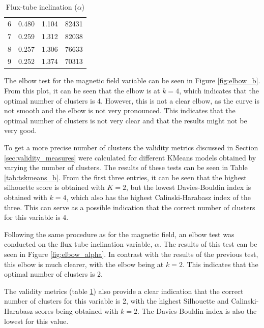 \begin{table}[h]
\begin{subtable}[h]{0.48\textwidth}
\begin{tabular}{@{}cccc@{}}
            6          & 0.480               & 1.104                   & 82431                  \\
            7          & 0.259               & 1.312                   & 82038                  \\
            8          & 0.257               & 1.306                   & 76633                  \\
            9          & 0.252               & 1.374                   & 70313                  \\ \bottomrule
            \end{tabular}
        \caption{Flux-tube inclination ($\alpha$)}
        \label{tab:tskmeans_alpha}
    \end{subtable}
\end{table}


The elbow test for the magnetic field variable can be seen in Figure \ref{fig:elbow_b}. From this plot, it can be seen that the elbow is at $k=4$, which indicates that the optimal number of clusters is 4. However, this is not a clear elbow, as the curve is not smooth and the elbow is not very pronounced. This indicates that the optimal number of clusters is not very clear and that the results might not be very good.

To get a more precise number of clusters the validity metrics discussed in Section \ref{sec:validity_measures} were calculated for different KMeans models obtained by varying the number of clusters. The results of these tests can be seen in Table \ref{tab:tskmeans_b}. From the first three entries, it can be seen that the highest silhouette score is obtained with $K=2$, but the lowest Davies-Bouldin index is obtained with $k=4$, which also has the highest Calinski-Harabasz index of the three. This can serve as a possible indication that the correct number of clusters for this variable is 4.

Following the same procedure as for the magnetic field, an elbow test was conducted on the flux tube inclination variable, $\alpha$. The results of this test can be seen in Figure \ref{fig:elbow_alpha}. In contrast with the results of the previous test, this elbow is much clearer, with the elbow being at $k=2$. This indicates that the optimal number of clusters is 2.

The validity metrics (table \ref{tab:tskmeans_alpha}) also provide a clear indication that the correct number of clusters for this variable is 2, with the highest Silhouette and Calinski-Harabasz scores being obtained with $k=2$. The Davies-Bouldin index is also the lowest for this value.


